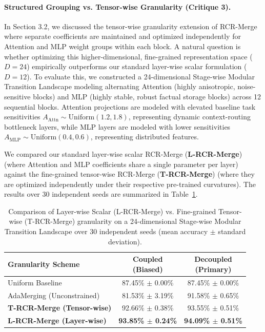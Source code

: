 \paragraph{Structured Grouping vs. Tensor-wise Granularity (Critique 3).}
In Section 3.2, we discussed the tensor-wise granularity extension of RCR-Merge where separate coefficients are maintained and optimized independently for Attention and MLP weight groups within each block. A natural question is whether optimizing this higher-dimensional, fine-grained representation space ($D=24$) empirically outperforms our standard layer-wise scalar formulation ($D=12$). 
To evaluate this, we constructed a 24-dimensional Stage-wise Modular Transition Landscape modeling alternating Attention (highly anisotropic, noise-sensitive blocks) and MLP (highly stable, robust factual storage blocks) across 12 sequential blocks. Attention projections are modeled with elevated baseline task sensitivities $A_{\text{Attn}} \sim \text{Uniform}(1.2, 1.8)$, representing dynamic context-routing bottleneck layers, while MLP layers are modeled with lower sensitivities $A_{\text{MLP}} \sim \text{Uniform}(0.4, 0.6)$, representing distributed features. 

We compared our standard layer-wise scalar RCR-Merge (\textbf{L-RCR-Merge}) (where Attention and MLP coefficients share a single parameter per layer) against the fine-grained tensor-wise RCR-Merge (\textbf{T-RCR-Merge}) (where they are optimized independently under their respective pre-trained curvatures). The results over 30 independent seeds are summarized in Table~\ref{tab:granularity_results}.

\begin{table}[h]
\caption{Comparison of Layer-wise Scalar (L-RCR-Merge) vs. Fine-grained Tensor-wise (T-RCR-Merge) granularity on a 24-dimensional Stage-wise Modular Transition Landscape over 30 independent seeds (mean accuracy $\pm$ standard deviation).}
\label{tab:granularity_results}
\vskip 0.1in
\begin{center}
\begin{small}
\begin{sc}
\begin{tabular}{l|cc}
\toprule
Granularity Scheme & \shortstack{Coupled \\ (Biased)} & \shortstack{Decoupled \\ (Primary)} \\
\midrule
Uniform Baseline & 87.45\% $\pm$ 0.00\% & 87.45\% $\pm$ 0.00\% \\
AdaMerging (Unconstrained) & 81.53\% $\pm$ 3.19\% & 91.58\% $\pm$ 0.65\% \\
\textbf{T-RCR-Merge (Tensor-wise)} & 92.66\% $\pm$ 0.38\% & 93.55\% $\pm$ 0.51\% \\
\textbf{L-RCR-Merge (Layer-wise)} & \textbf{93.85\% $\pm$ 0.24\%} & \textbf{94.09\% $\pm$ 0.51\%} \\
\bottomrule
\end{tabular}
\end{sc}
\end{small}
\end{center}
\vskip -0.1in
\end{table}

